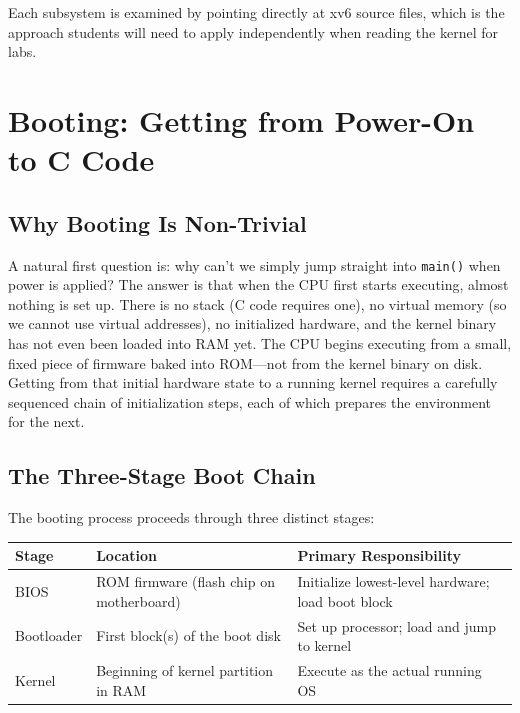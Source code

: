 \documentclass[11pt]{article}
\begin{document}
Each subsystem is examined by pointing directly at xv6 source files, which is the approach students will need to apply independently when reading the kernel for labs.

\section{Booting: Getting from Power-On to C Code}

\subsection{Why Booting Is Non-Trivial}

A natural first question is: why can't we simply jump straight into \texttt{main()} when power is applied? The answer is that when the CPU first starts executing, almost nothing is set up. There is no stack (C code requires one), no virtual memory (so we cannot use virtual addresses), no initialized hardware, and the kernel binary has not even been loaded into RAM yet. The CPU begins executing from a small, fixed piece of firmware baked into ROM---not from the kernel binary on disk. Getting from that initial hardware state to a running kernel requires a carefully sequenced chain of initialization steps, each of which prepares the environment for the next.

\subsection{The Three-Stage Boot Chain}

The booting process proceeds through three distinct stages:

\begin{center}
\begin{tabular}{lll}
\toprule
\textbf{Stage} & \textbf{Location} & \textbf{Primary Responsibility} \\
\midrule
BIOS & ROM firmware (flash chip on motherboard) & Initialize lowest-level hardware; load boot block \\
Bootloader & First block(s) of the boot disk & Set up processor; load and jump to kernel \\
Kernel & Beginning of kernel partition in RAM & Execute as the actual running OS \\
\bottomrule
\end{tabular}
\end{center}
\end{document}
